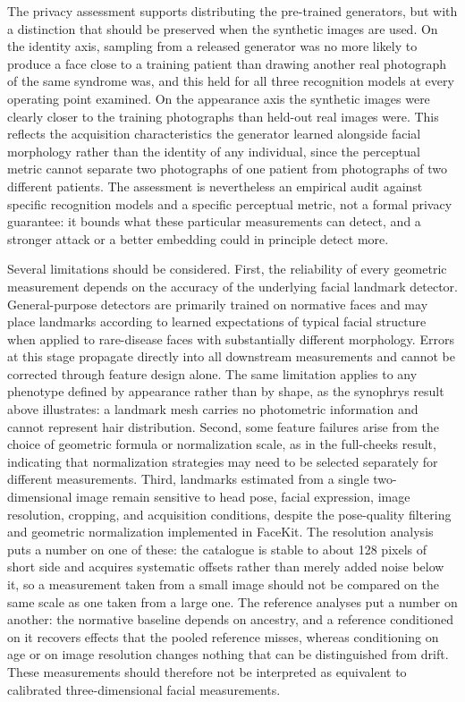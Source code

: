 \documentclass[11pt]{article}
\begin{document}
The privacy assessment supports distributing the pre-trained generators, but with a distinction that should be preserved when the synthetic images are used. On the identity axis, sampling from a released generator was no more likely to produce a face close to a training patient than drawing another real photograph of the same syndrome was, and this held for all three recognition models at every operating point examined. On the appearance axis the synthetic images were clearly closer to the training photographs than held-out real images were. This reflects the acquisition characteristics the generator learned alongside facial morphology rather than the identity of any individual, since the perceptual metric cannot separate two photographs of one patient from photographs of two different patients. The assessment is nevertheless an empirical audit against specific recognition models and a specific perceptual metric, not a formal privacy guarantee: it bounds what these particular measurements can detect, and a stronger attack or a better embedding could in principle detect more.

Several limitations should be considered. First, the reliability of every geometric measurement depends on the accuracy of the underlying facial landmark detector. General-purpose detectors are primarily trained on normative faces and may place landmarks according to learned expectations of typical facial structure when applied to rare-disease faces with substantially different morphology. Errors at this stage propagate directly into all downstream measurements and cannot be corrected through feature design alone. The same limitation applies to any phenotype defined by appearance rather than by shape, as the synophrys result above illustrates: a landmark mesh carries no photometric information and cannot represent hair distribution. Second, some feature failures arise from the choice of geometric formula or normalization scale, as in the full-cheeks result, indicating that normalization strategies may need to be selected separately for different measurements. Third, landmarks estimated from a single two-dimensional image remain sensitive to head pose, facial expression, image resolution, cropping, and acquisition conditions, despite the pose-quality filtering and geometric normalization implemented in FaceKit. The resolution analysis puts a number on one of these: the catalogue is stable to about 128 pixels of short side and acquires systematic offsets rather than merely added noise below it, so a measurement taken from a small image should not be compared on the same scale as one taken from a large one. The reference analyses put a number on another: the normative baseline depends on ancestry, and a reference conditioned on it recovers effects that the pooled reference misses, whereas conditioning on age or on image resolution changes nothing that can be distinguished from drift. These measurements should therefore not be interpreted as equivalent to calibrated three-dimensional facial measurements.
\end{document}
